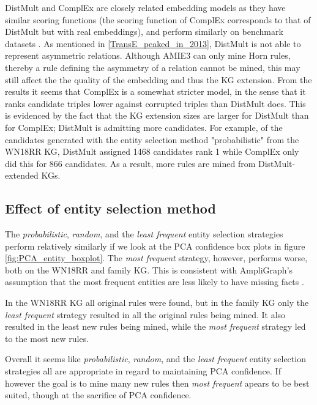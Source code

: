 DistMult and ComplEx are closely related embedding models as they have similar scoring functions (the scoring function of ComplEx corresponds to that of DistMult but with real embeddings), and perform similarly on benchmark datasets \cite{complEx}. As mentioned in \cref{TransE_peaked_in_2013}, DistMult is not able to represent asymmetric relations. Although AMIE3 can only mine Horn rules, thereby a rule defining the asymmetry of a relation cannot be mined, this may still affect the the quality of the embedding and thus the KG extension. From the results it seems that ComplEx is a somewhat stricter model, in the sense that it ranks candidate triples lower against corrupted triples than DistMult does. This is evidenced by the fact that the KG extension sizes are larger for DistMult than for ComplEx; DistMult is admitting more candidates. For example, of the candidates generated with the entity selection method "probabilistic" from the WN18RR KG, DistMult assigned 1468 candidates rank 1 while ComplEx only did this for 866 candidates. As a result, more rules are mined from DistMult-extended KGs. 

\newpage
\subsection{Effect of entity selection method}
The \textit{probabilistic}, \textit{random}, and the \textit{least frequent} entity selection strategies perform relatively similarly if we look at the PCA confidence box plots in figure \ref{fig:PCA_entity_boxplot}. The \textit{most frequent} strategy, however, performs worse, both on the WN18RR and family KG. This is consistent with AmpliGraph's assumption that the most frequent entities are less likely to have missing facts \cite{kge_tutorial}.

In the WN18RR KG all original rules were found, but in the family KG only the \textit{least frequent} strategy resulted in all the original rules being mined. It also resulted in the least new rules being mined, while the \textit{most frequent} strategy led to the most new rules.

Overall it seems like \textit{probabilistic}, \textit{random}, and the \textit{least frequent} entity selection strategies all are appropriate in regard to maintaining PCA confidence. If however the goal is to mine many new rules then \textit{most frequent} apears to be best suited, though at the sacrifice of PCA confidence.


